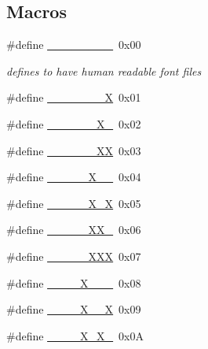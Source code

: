 \subsection*{Macros}
\textbf{ }\par
\begin{DoxyCompactItemize}
\item 
\#define \hyperlink{a00101_a9d84173475a27bae9dd92e0cbb70f66a_a9d84173475a27bae9dd92e0cbb70f66a}{\+\_\+\+\_\+\+\_\+\+\_\+\+\_\+\+\_\+\+\_\+\+\_\+}~0x00
\begin{DoxyCompactList}\small\item\em defines to have human readable font files \end{DoxyCompactList}\item 
\#define \hyperlink{a00101_a5fd99299cee7692a165e64af81013142_a5fd99299cee7692a165e64af81013142}{\+\_\+\+\_\+\+\_\+\+\_\+\+\_\+\+\_\+\+\_\+X}~0x01
\item 
\#define \hyperlink{a00101_ace557d9e1eef8da053b275e5d81a709f_ace557d9e1eef8da053b275e5d81a709f}{\+\_\+\+\_\+\+\_\+\+\_\+\+\_\+\+\_\+\+X\+\_\+}~0x02
\item 
\#define \hyperlink{a00101_a46157de01f65c217e9553c7bf69b0445_a46157de01f65c217e9553c7bf69b0445}{\+\_\+\+\_\+\+\_\+\+\_\+\+\_\+\+\_\+\+XX}~0x03
\item 
\#define \hyperlink{a00101_a630029c1bf8cd412388ded808a2d63e8_a630029c1bf8cd412388ded808a2d63e8}{\+\_\+\+\_\+\+\_\+\+\_\+\+\_\+\+X\+\_\+\+\_\+}~0x04
\item 
\#define \hyperlink{a00101_a07ca7605f943e7c621848dbbd047bb6e_a07ca7605f943e7c621848dbbd047bb6e}{\+\_\+\+\_\+\+\_\+\+\_\+\+\_\+\+X\+\_\+X}~0x05
\item 
\#define \hyperlink{a00101_ac8045b2efa6b26996164b6e36dad4735_ac8045b2efa6b26996164b6e36dad4735}{\+\_\+\+\_\+\+\_\+\+\_\+\+\_\+\+X\+X\+\_\+}~0x06
\item 
\#define \hyperlink{a00101_adebe58f7040622b21082f16b69fc24dd_adebe58f7040622b21082f16b69fc24dd}{\+\_\+\+\_\+\+\_\+\+\_\+\+\_\+\+X\+XX}~0x07
\item 
\#define \hyperlink{a00101_a3cf50acc6a1b0a2071472dc21c2abced_a3cf50acc6a1b0a2071472dc21c2abced}{\+\_\+\+\_\+\+\_\+\+\_\+\+X\+\_\+\+\_\+\+\_\+}~0x08
\item 
\#define \hyperlink{a00101_a5b982664ecd932a060154a349110998f_a5b982664ecd932a060154a349110998f}{\+\_\+\+\_\+\+\_\+\+\_\+\+X\+\_\+\+\_\+X}~0x09
\item 
\#define \hyperlink{a00101_adae11668127a61f9d000cd4ce866a6b2_adae11668127a61f9d000cd4ce866a6b2}{\+\_\+\+\_\+\+\_\+\+\_\+\+X\+\_\+\+X\+\_\+}~0x0A

\end{DoxyCompactItemize}
